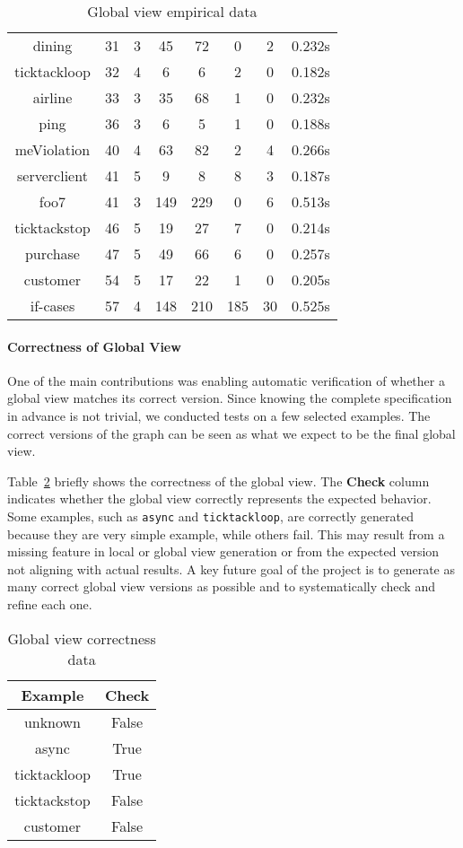 \begin{table}[!ht]
\begin{tabular}{|c|c|c|c|c|c|c|c|}
dining & 31 & 3 & 45 & 72 & 0 & 2 & 0.232s \\ 
ticktackloop & 32 & 4 & 6 & 6 & 2 & 0 & 0.182s \\ 
airline & 33 & 3 & 35 & 68 & 1 & 0 & 0.232s \\ 
ping & 36 & 3 & 6 & 5 & 1 & 0 & 0.188s \\ 
meViolation & 40 & 4 & 63 & 82 & 2 & 4 & 0.266s \\ 
serverclient & 41 & 5 & 9 & 8 & 8 & 3 & 0.187s \\ 
foo7 & 41 & 3 & 149 & 229 & 0 & 6 & 0.513s \\ 
ticktackstop & 46 & 5 & 19 & 27 & 7 & 0 & 0.214s \\ 
purchase & 47 & 5 & 49 & 66 & 6 & 0 & 0.257s \\ 
customer & 54 & 5 & 17 & 22 & 1 & 0 & 0.205s \\ 
if-cases & 57 & 4 & 148 & 210 & 185 & 30 & 0.525s \\ 
\hline
\end{tabular}
\caption{Global view empirical data}
\label{tab:gvbench}
\end{table}

\paragraph{Correctness of Global View}
One of the main contributions was enabling automatic verification of whether a
global view matches its correct version. Since knowing the complete specification
in advance is not trivial, we conducted tests on a few selected examples. 
The correct versions of the graph can be seen as what we expect to be the final
global view.

Table~\ref{tab:corrbench} briefly shows the correctness of the global view. 
The \textbf{Check} column indicates whether the global view 
correctly represents the expected behavior. Some examples, such as 
\texttt{async} and \texttt{ticktackloop}, are correctly generated because they 
are very simple example, while others fail. This may result from a missing 
feature in local or global view generation or from
the expected version not aligning with actual results. A key future goal of the
project is to generate as many correct global view versions as possible and to
systematically check and refine each one.

\begin{table}[!ht]
\centering
\begin{tabular}{|c|c|}
\hline
Example & Check \\ 
\hline
unknown & False \\ 
async & True \\ 
ticktackloop & True \\ 
ticktackstop & False \\ 
customer & False \\ 
\hline
\end{tabular}
\caption{Global view correctness data}
\label{tab:corrbench}
\end{table}
